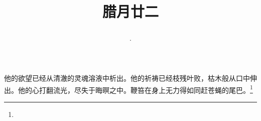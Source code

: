 \title{\date[d=1,m=2,y=2024][year:cn-y,年,month:cn,day:cn,日,·,weekday]·腊月廿二 }
他的欲望已经从清澈的灵魂溶液中析出。他的祈祷已经枝残叶败，枯木般从口中伸出。他的心打翻流光，尽失于晦暝之中。鞭笞在身上无力得如同赶苍蝇的尾巴。\footnote{ }

